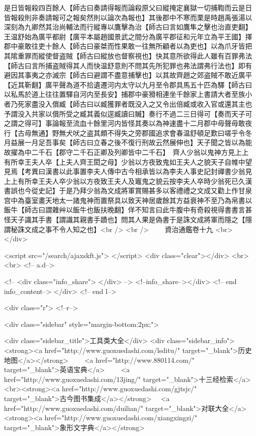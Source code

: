 是日皆報殺四百餘人【師古曰奏請得報而論殺原父曰縱掩定襄獄一切捕鞫而云是日皆報殺則非奏請報可之報矣然則以論次為報也】其後郡中不寒而栗是時趙禹張湯以深刻為九卿然其治尚輔法而行縱專以鷹擊為治【師古曰言如鷹隼之擊也治直吏翻】王温舒始為廣平都尉【廣平本屬趙國景武之間分為廣平郡征和元年立為平王國】擇郡中豪敢往吏十餘人【師古曰豪桀而性果敢一往無所顧者以為吏也】以為爪牙皆把其隂重罪而縱使督盗賊【師古曰縱放也督察視也】快其意所欲得此人雖有百罪弗法【師古曰言所捕盗賊得其人而快温舒意則不問其先所犯罪也弗法謂弗行法也】即有避因其事夷之亦滅宗【師古曰避謂不盡意捕擊也】以其故齊趙之郊盗賊不敢近廣平【近其靳翻】廣平聲為道不拾遺遷河内太守以九月至令郡具馬五十匹為驛【師古曰以私馬於道上往往置驛自河内至長安】捕郡中豪猾相連坐千餘家上書請大者至族小者乃死家盡没入償臧【師古曰以臧獲罪者既没入之又令出倍臧或收入官或還其主也予謂没入共家以償所受之臧其義似逕臧讀曰贓】奏行不過二三日得可【奏而天子可之謂之得可】事論報至流血十餘里河内皆怪其奏以為神速盡十二月郡中毋聲毋敢夜行【古毋無通】野無犬吠之盗其頗不得失之旁郡國追求會春温舒頓足歎曰嗟乎令冬月益展一月足吾事矣【師古曰立春之後不復行刑故云然展伸也】天子聞之皆以為能故擢為中二千石【郡守二千石正卿及列卿皆中二千石】　齊人少翁以鬼神方見上上有所幸王夫人卒【上夫人齊王閎之母】少翁以方夜致鬼如王夫人之貌天子自帷中望見焉【考異曰漢書以此事置李夫人傳中古今相承皆以為李夫人事史記封禪書少翁見上上有所幸王夫人卒少翁以方夜致王夫人及竈鬼之貌云按李夫人卒時少翁死已久漢書誤也今從史記】于是乃拜少翁為文成將軍賞賜甚多以客禮禮之文成又勸上作甘泉宫中為臺室畫天地太一諸鬼神而置祭具以致天神居歲餘其方益衰神不至乃為帛書以飯牛【師古曰謂雜艸以飯牛也飯扶晚翻】佯不知言曰此牛腹中有奇殺視得書書言甚怪天子識其手書【謂識其親書手蹟也】問其人果是偽書于是誅文成將軍而隱之【隱謂秘誅文成之事不令人知之也】<br />
<br />
　　資治通鑑卷十九  <br>
   </div> 

<script src="/search/ajaxskft.js"> </script>
 <div class="clear"></div>
<br>
<br>
 <!-- a.d-->

 <!--
<div class="info_share">
</div> 
-->
 <!--info_share--></div>   <!-- end info_content-->
  </div> <!-- end l-->

<div class="r">   <!--r-->



<div class="sidebar"  style="margin-bottom:2px;">

 
<div class="sidebar_title">工具类大全</div>
<div class="sidebar_info">
<strong><a href="http://www.guoxuedashi.com/lsditu/" target="_blank">历史地图</a></strong>　　
<a href="http://www.880114.com/" target="_blank">英语宝典</a>　　
<a href="http://www.guoxuedashi.com/13jing/" target="_blank">十三经检索</a>　
<br><strong><a href="http://www.guoxuedashi.com/gjtsjc/" target="_blank">古今图书集成</a></strong>　
<a href="http://www.guoxuedashi.com/duilian/" target="_blank">对联大全</a>　<strong><a href="http://www.guoxuedashi.com/xiangxingzi/" target="_blank">象形文字典</a></strong>　


